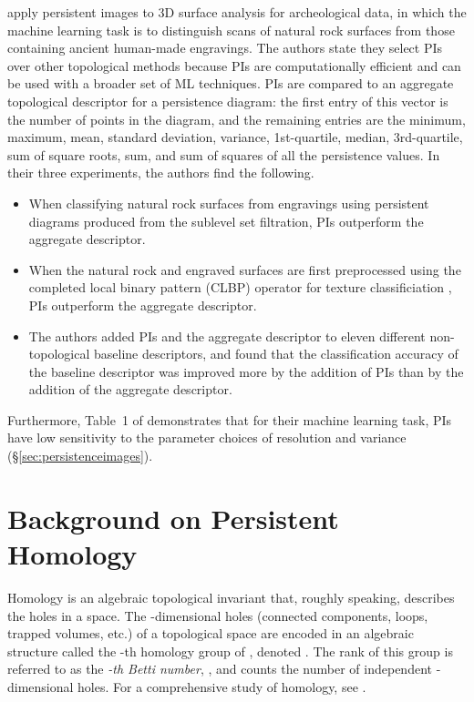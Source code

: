 \documentclass[11pt]{article}
\begin{document}
\citet{zeppelzauer2016topological} apply persistent images to 3D surface analysis for archeological data, in which the machine learning task is to distinguish scans of natural rock surfaces from those containing ancient human-made engravings. The authors state they select PIs over other topological methods because PIs are computationally efficient and can be used with a broader set of ML techniques. PIs are compared to an aggregate topological descriptor for a persistence diagram: the first entry of this vector is the number of points in the diagram, and the remaining entries are the minimum, maximum, mean, standard deviation, variance, 1st-quartile, median, 3rd-quartile, sum of square roots, sum, and sum of squares of all the persistence values. In their three experiments, the authors find the following.
\begin{itemize}
\item When classifying natural rock surfaces from engravings using persistent diagrams produced from the sublevel set filtration, PIs outperform the aggregate descriptor.
\item When the natural rock and engraved surfaces are first preprocessed using the completed local binary pattern (CLBP) operator for texture classificiation \citep{guo2010completed}, PIs outperform the aggregate descriptor.
\item The authors added PIs and the aggregate descriptor to eleven different non-topological baseline descriptors, and found that the classification accuracy of the baseline descriptor was improved more by the addition of PIs than by the addition of the aggregate descriptor.
\end{itemize}
Furthermore, Table~1 of \citet{zeppelzauer2016topological} demonstrates that for their machine learning task, PIs have low sensitivity to the parameter choices of resolution and variance (\S\ref{sec:persistenceimages}).

\section{Background on Persistent Homology}\label{sec:background}

Homology is an algebraic topological invariant that, roughly speaking, describes the holes in a space. The -dimensional holes (connected components, loops, trapped volumes, etc.) of a topological space  are encoded in an algebraic structure called the -th homology group of , denoted .  The rank of this group is referred to as the \emph{-th Betti number}, , and counts the number of independent -dimensional holes. For a comprehensive study of homology, see \citet{hatcher2002algebraic}.
\end{document}
